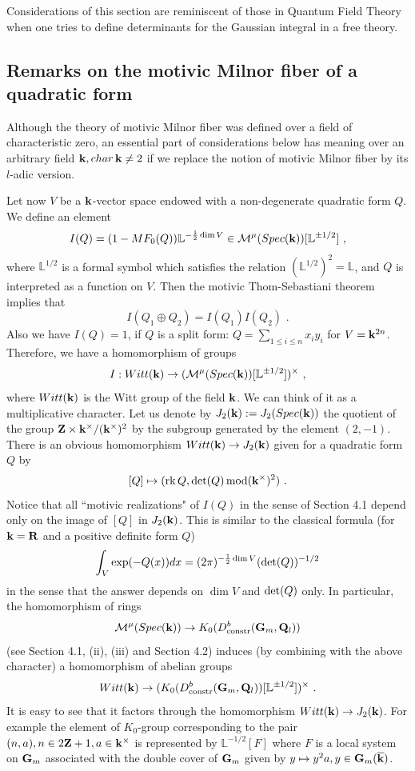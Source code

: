 \documentclass[12pt]{article}
\begin{document}
Considerations of this section are reminiscent of those in Quantum Field Theory when one tries to define determinants for the Gaussian integral in a free theory.

\subsection{Remarks on the motivic Milnor fiber of a quadratic form}

Although  the theory of motivic Milnor fiber was defined over a field of characteristic zero, an
essential part of considerations below has meaning over an arbitrary field ${\bf k}, char\,{\bf k}\ne 2$ if we replace the notion of motivic Milnor fiber by its $l$-adic version.

Let now $V$ be a ${\bf k}$-vector space endowed with a non-degenerate quadratic form $Q$. We define an element
$${I}(Q)=(1-MF_0(Q)){\mathbb L}^{-{1\over{2}}\dim V}\in {\cal M}^{\mu}(Spec({\bf k}))[{\mathbb L}^{\pm 1/2}]\,\,,$$
 where
${\mathbb L}^{1/2}$ is a formal symbol which satisfies the relation $({\mathbb L}^{1/2})^2={\mathbb L}$, and $Q$ is interpreted as a function on $V$.
Then the motivic Thom-Sebastiani theorem implies
that $${I}(Q_1\oplus Q_2)={I}(Q_1){I}(Q_2)\,\,.$$
 Also we have ${I}(Q)=1$, if $Q$ is a split form: $Q=\sum_{1\le i\le n}x_iy_i$
for $V={\bf k}^{2n}$. Therefore, 
 we have a homomorphism of groups $$I:Witt({\bf k})\to ({\cal M}^{\mu}(Spec({\bf k}))[{\mathbb L}^{\pm 1/2}])^{\times}\,\,,$$
 where $Witt({\bf k})$ is the Witt group of the field ${\bf k}$. We can think of it as a multiplicative character. Let us denote by $J_2({\bf k}):=J_2(Spec({\bf k}))$ the quotient of the group ${\bf Z}\times {\bf k}^{\times}/({\bf k}^{\times})^2$
by the subgroup generated by the element $(2,-1)$. There is an obvious homomorphism $Witt({\bf k})\to J_2({\bf k})$ given for a quadratic form $Q$ by $$[Q]\mapsto (\operatorname{rk}Q, \operatorname{det}(Q)\operatorname{mod}({\bf k}^{\times})^2)\,\,.$$
 Notice that all ``motivic realizations" of ${I}(Q)$ in the sense of Section 4.1 depend only on the image of $[Q]$ in $J_2({\bf k})$. This is similar to the classical formula (for ${\bf k}={\bf R}$ and a positive definite form $Q$)
$$\int_V\exp(-Q(x))dx=(2\pi)^{-{1\over{2}}\dim V}(\operatorname{det}(Q))^{-1/2}$$ in the sense that the answer depends on $\dim V$ and
$\operatorname{det}(Q)$ only.
In particular, the homomorphism of rings $${\cal M}^{\mu}(Spec({\bf k}))\to K_0(D^b_{\operatorname{constr}}({\bf G}_m, {\bf Q}_l))$$ (see Section 4.1, (ii), (iii) and Section 4.2) induces (by combining with the above character) a homomorphism of abelian groups
$$Witt({\bf k})\to (K_0(D^b_{\operatorname{constr}}({\bf G}_m, {\bf Q}_l))[{\mathbb L}^{\pm 1/2}])^{\times}\,\,.$$ It is easy to see that it factors through the homomorphism
$Witt({\bf k})\to J_2({\bf k})$. For example the element of $K_0$-group corresponding to the pair $(n,a), n\in 2{\bf Z}+1, a\in {\bf k}^{\times}$ is represented by ${\mathbb L}^{-1/2}[F]$ where $F$ is a local system on ${\bf G}_m$ associated with the double cover of ${\bf G}_m$ given by $y\mapsto y^2a, y\in {\bf G}_m({\overline{\bf k}})$.
\end{document}
